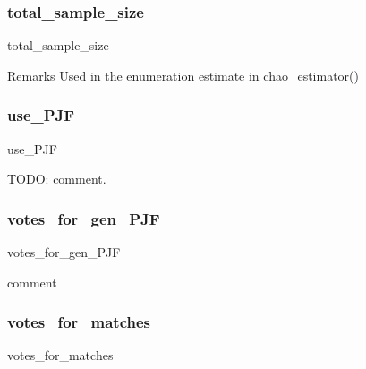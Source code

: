 \subsubsection{\texorpdfstring{total\_sample\_size}{total\_sample\_size}}
{\footnotesize\ttfamily total\+\_\+sample\+\_\+size}

\begin{DoxyRemark}{Remarks}
Used in the enumeration estimate in \mbox{\hyperlink{classdynamicfilterapp_1_1models_1_1_join_a582efaf16c8455e890ef61101a863966}{chao\+\_\+estimator()}} 
\end{DoxyRemark}
\mbox{\label{classdynamicfilterapp_1_1models_1_1_join_afa2420ab7aa01c8f122f69a12c216d71}} 
\subsubsection{\texorpdfstring{use\_PJF}{use\_PJF}}
{\footnotesize\ttfamily use\+\_\+\+P\+JF}



T\+O\+DO\+: comment. 

\mbox{\label{classdynamicfilterapp_1_1models_1_1_join_ad71de0d05082c97b065e5b6680d9bb9f}} 
\subsubsection{\texorpdfstring{votes\_for\_gen\_PJF}{votes\_for\_gen\_PJF}}
{\footnotesize\ttfamily votes\+\_\+for\+\_\+gen\+\_\+\+P\+JF}



comment 

\mbox{\label{classdynamicfilterapp_1_1models_1_1_join_a37ebe7382290ac568bf48292decfecd4}} 
\subsubsection{\texorpdfstring{votes\_for\_matches}{votes\_for\_matches}}
{\footnotesize\ttfamily votes\+\_\+for\+\_\+matches}

